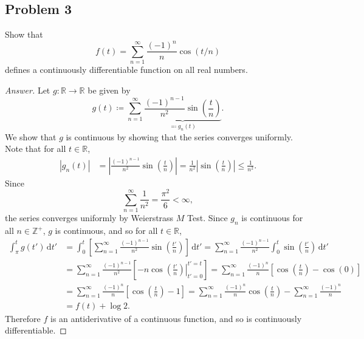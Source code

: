 \documentclass[12pt]{article}
\newcommand{\z}{\mathbb{Z}}
\newcommand{\real}{\mathbb{R}}
\newcommand\paren[1]{\left( #1 \right)}
\newcommand{\sqbrack}[1]{\left [ #1 \right ]}
\newcommand{\abs}[1]{\left | #1 \right |}
\theoremstyle{definition}
\begin{document}
\subsection{Problem 3 \texorpdfstring{\cite{Dennis}}{}}
Show that 
\[
    f(t) = \sum\limits_{n = 1}^{\infty} \frac{(-1)^n}{n} \cos(t/n)
\]
defines a continuously differentiable function on all real numbers.
\begin{proof}[Answer]
    Let $g : \real \to \real$ be given by 
    \[
        g(t) \coloneqq \sum\limits_{n = 1}^{\infty} \underbrace{ \frac{(-1)^{n-1}}{n^2} \sin \paren{ \frac{t}{n} } }_{ \eqqcolon g_n(t) }.
    \]
    We show that $g$ is continuous by showing that the series converges uniformly. Note that for all $t \in \real$,
    \begin{align*}
        \abs{ g_n(t) } & = \abs{ \frac{(-1)^{n-1}}{n^2} \sin \paren{ \frac{t}{n} } } = \frac{1}{n^2} \abs{ \sin \paren{ \frac{t}{n} } } \leq \frac{1}{n^2}.
    \end{align*}
    Since
    \[
        \sum\limits_{n = 1}^{\infty} \frac{1}{n^2} = \frac{\pi^2}{6} < \infty,
    \]
    the series converges uniformly by Weierstrass $M$ Test. Since $g_n$ is continuous for all $n \in \z^+$, $g$ is continuous, and so for all $t \in \real$,
    \begin{align*}
        \int_{\pi}^t g \paren{t'} \, \mathrm{d}t' & = \int_{0}^t \sqbrack{ \sum\limits_{n = 1}^{\infty} \frac{(-1)^{n-1}}{n^2} \sin \paren{ \frac{t'}{n} } } \, \mathrm{d}t' = \sum\limits_{n = 1}^{\infty} \frac{(-1)^{n-1}}{n^2} \int_{0}^{t} \sin \paren{ \frac{t'}{n} } \, \mathrm{d}t' \\
        & = \sum\limits_{n = 1}^{\infty} \frac{(-1)^{n-1}}{n^2} \sqbrack{ \left. -n \cos \paren{ \frac{t'}{n} } \right|_{t' = 0}^{t' = t} } = \sum\limits_{n = 1}^{\infty} \frac{(-1)^{n}}{n} \sqbrack{ \cos \paren{ \frac{t}{n} } - \cos (0) } \\
        & = \sum\limits_{n = 1}^{\infty} \frac{(-1)^{n}}{n} \sqbrack{ \cos \paren{ \frac{t}{n} } - 1 } = \sum\limits_{n = 1}^{\infty} \frac{(-1)^{n}}{n} \cos \paren{ \frac{t}{n} } - \sum\limits_{n = 1}^{\infty} \frac{(-1)^{n}}{n} \\
        & = f(t) + \log 2.
    \end{align*}
    Therefore $f$ is an antiderivative of a continuous function, and so is continuously differentiable. 
\end{proof}
\end{document}
